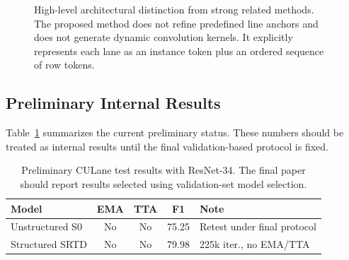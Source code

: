 \documentclass[conference]{IEEEtran}
\begin{document}
\begin{figure}[t]
\centering
{}
\caption{High-level architectural distinction from strong related methods. The proposed method does not refine predefined line anchors and does not generate dynamic convolution kernels. It explicitly represents each lane as an instance token plus an ordered sequence of row tokens.}
\label{fig:methodcomparison}
\end{figure}

\subsection{Preliminary Internal Results}

Table~\ref{tab:prelim} summarizes the current preliminary status. These numbers should be treated as internal results until the final validation-based protocol is fixed.

\begin{table}[t]
\centering
\caption{Preliminary CULane test results with ResNet-34. The final paper should report results selected using validation-set model selection.}
\label{tab:prelim}
\footnotesize
\setlength{\tabcolsep}{2.5pt}
\begin{tabularx}{\linewidth}{>{\raggedright\arraybackslash}X c c c >{\raggedright\arraybackslash}X}
\toprule
Model & EMA & TTA & F1 & Note \\
\midrule
Unstructured S0 & No & No & 75.25 & Retest under final protocol \\
Structured SRTD & No & No & 79.98 & 225k iter., no EMA/TTA \\
\bottomrule
\end{tabularx}
\end{table}
\end{document}

